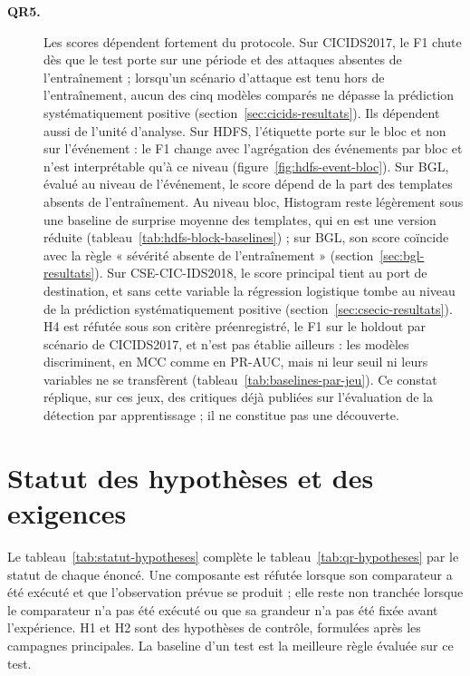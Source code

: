 \begin{description}
    \item[\textbf{QR5.}]
    Les scores dépendent fortement du protocole. Sur CICIDS2017, le F1 chute dès que le test porte sur une période et des attaques absentes de l'entraînement ; lorsqu'un scénario d'attaque est tenu hors de l'entraînement, aucun des cinq modèles comparés ne dépasse la prédiction systématiquement positive (section~\ref{sec:cicids-resultats}). Ils dépendent aussi de l'unité d'analyse. Sur HDFS, l'étiquette porte sur le bloc et non sur l'événement : le F1 change avec l'agrégation des événements par bloc et n'est interprétable qu'à ce niveau (figure~\ref{fig:hdfs-event-bloc}). Sur BGL, évalué au niveau de l'événement, le score dépend de la part des templates absents de l'entraînement. Au niveau bloc, Histogram reste légèrement sous une baseline de surprise moyenne des templates, qui en est une version réduite (tableau~\ref{tab:hdfs-block-baselines}) ; sur BGL, son score coïncide avec la règle « sévérité absente de l'entraînement » (section~\ref{sec:bgl-resultats}). Sur CSE-CIC-IDS2018, le score principal tient au port de destination, et sans cette variable la régression logistique tombe au niveau de la prédiction systématiquement positive (section~\ref{sec:csecic-resultats}). H4 est réfutée sous son critère préenregistré, le F1 sur le holdout par scénario de CICIDS2017, et n'est pas établie ailleurs : les modèles discriminent, en MCC comme en PR-AUC, mais ni leur seuil ni leurs variables ne se transfèrent (tableau~\ref{tab:baselines-par-jeu}). Ce constat réplique, sur ces jeux, des critiques déjà publiées sur l'évaluation de la détection par apprentissage \cite{sommer2010outside,arp2022dos,engelen2021troubleshooting} ; il ne constitue pas une découverte.

\end{description}


\section*{Statut des hypothèses et des exigences}

Le tableau~\ref{tab:statut-hypotheses} complète le tableau~\ref{tab:qr-hypotheses} par le statut de chaque énoncé. Une composante est réfutée lorsque son comparateur a été exécuté et que l'observation prévue se produit ; elle reste non tranchée lorsque le comparateur n'a pas été exécuté ou que sa grandeur n'a pas été fixée avant l'expérience. H1 et H2 sont des hypothèses de contrôle, formulées après les campagnes principales. La baseline d'un test est la meilleure règle évaluée sur ce test.

